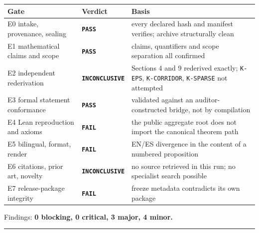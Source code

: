 \documentclass[
  10pt,
]{article}
\newcounter{none} %
\begin{document}
{\def\LTcaptype{none} %
\begin{longtable}[]{@{}
  >{\raggedright\arraybackslash}p{}
  >{\raggedright\arraybackslash}p{}
  >{\raggedright\arraybackslash}p{}@{}}
\toprule\noalign{}
\begin{minipage}[b]{\linewidth}\raggedright
Gate
\end{minipage} & \begin{minipage}[b]{\linewidth}\raggedright
Verdict
\end{minipage} & \begin{minipage}[b]{\linewidth}\raggedright
Basis
\end{minipage} \\
\midrule\noalign{}
\endhead
\bottomrule\noalign{}
\endlastfoot
E0 intake, provenance, sealing & \textbf{\texttt{PASS}} & every declared
hash and manifest verifies; archive structurally clean \\
E1 mathematical claims and scope & \textbf{\texttt{PASS}} & claims,
quantifiers and scope separation all confirmed \\
E2 independent rederivation & \textbf{\texttt{INCONCLUSIVE}} & Sections
4 and 9 rederived exactly; \texttt{K-EPS}, \texttt{K-CORRIDOR},
\texttt{K-SPARSE} not attempted \\
E3 formal statement conformance & \textbf{\texttt{PASS}} & validated
against an auditor-constructed bridge, not by compilation \\
E4 Lean reproduction and axioms & \textbf{\texttt{FAIL}} & the public
aggregate root does not import the canonical theorem path \\
E5 bilingual, format, render & \textbf{\texttt{FAIL}} & EN/ES divergence
in the content of a numbered proposition \\
E6 citations, prior art, novelty & \textbf{\texttt{INCONCLUSIVE}} & no
source retrieved in this run; no specialist search possible \\
E7 release-package integrity & \textbf{\texttt{FAIL}} & freeze metadata
contradicts its own package \\
\end{longtable}
}

Findings: \textbf{0 blocking, 0 critical, 3 major, 4 minor.}

\begin{center}\rule{0.5\linewidth}{0.5pt}\end{center}
\end{document}
